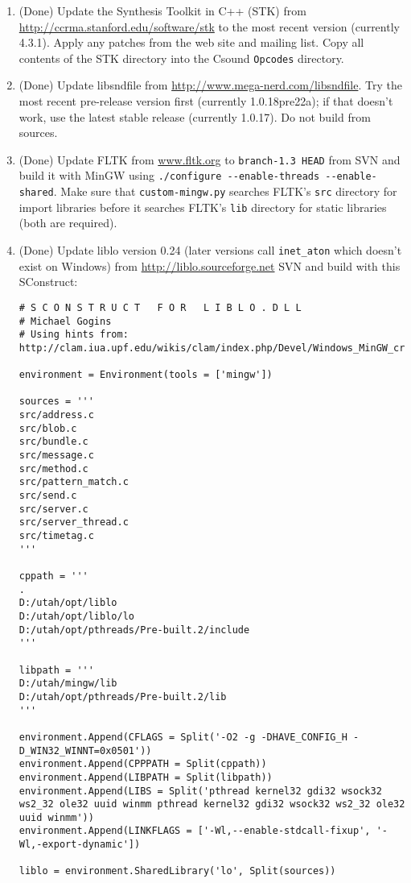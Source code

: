\documentclass[11pt,letterpaper,onecolumn]{scrartcl}
\begin{document}
\begin{sloppypar}
\begin{enumerate}
\begin{enumerate}
    	\item (Done) Update the Synthesis Toolkit in C++ (STK) from \url{http://ccrma.stanford.edu/software/stk} to the most recent version (currently 4.3.1). Apply any patches from the web site and mailing list. Copy all contents of the STK directory into the Csound \texttt{Opcodes} directory.
			\item (Done) Update libsndfile from \url{http://www.mega-nerd.com/libsndfile}. Try the most recent pre-release version first (currently 1.0.18pre22a); if that doesn't work, use the latest stable release (currently 1.0.17). Do not build from sources. 
    	\item (Done) Update FLTK from \url{www.fltk.org} to \texttt{branch-1.3 HEAD} from SVN and build it with MinGW using \verb|./configure --enable-threads --enable-shared|. Make sure that \texttt{custom-mingw.py} searches FLTK's \texttt{src} directory for import libraries before it searches FLTK's \texttt{lib} directory for static libraries (both are required).
     	\item (Done) Update liblo version 0.24 (later versions call \verb|inet_aton| which doesn't exist on Windows) from \url{http://liblo.sourceforge.net} SVN and build with this SConstruct:
    	
\begin{lstlisting}
# S C O N S T R U C T   F O R   L I B L O . D L L
# Michael Gogins
# Using hints from: http://clam.iua.upf.edu/wikis/clam/index.php/Devel/Windows_MinGW_cross_compile#liblo

environment = Environment(tools = ['mingw'])

sources = '''
src/address.c
src/blob.c
src/bundle.c
src/message.c
src/method.c
src/pattern_match.c
src/send.c
src/server.c
src/server_thread.c
src/timetag.c
'''

cppath = '''
.
D:/utah/opt/liblo
D:/utah/opt/liblo/lo
D:/utah/opt/pthreads/Pre-built.2/include
'''

libpath = '''
D:/utah/mingw/lib
D:/utah/opt/pthreads/Pre-built.2/lib
'''

environment.Append(CFLAGS = Split('-O2 -g -DHAVE_CONFIG_H -D_WIN32_WINNT=0x0501'))
environment.Append(CPPPATH = Split(cppath))
environment.Append(LIBPATH = Split(libpath))
environment.Append(LIBS = Split('pthread kernel32 gdi32 wsock32 ws2_32 ole32 uuid winmm pthread kernel32 gdi32 wsock32 ws2_32 ole32 uuid winmm'))
environment.Append(LINKFLAGS = ['-Wl,--enable-stdcall-fixup', '-Wl,-export-dynamic'])

liblo = environment.SharedLibrary('lo', Split(sources))
\end{lstlisting}


\end{enumerate}
\end{enumerate}
\end{sloppypar}
\end{document}
